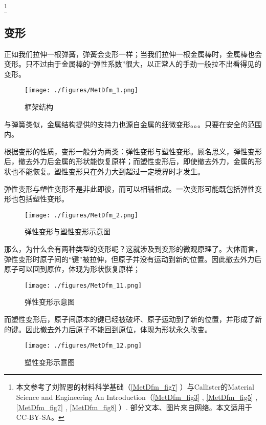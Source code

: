 
\footnote{本文参考了刘智恩的材料科学基础（\autoref{MetDfm_fig7} ）与Callister的Material Science and Engineering An Introduction（\autoref{MetDfm_fig3} , \autoref{MetDfm_fig5} , \autoref{MetDfm_fig7}  , \autoref{MetDfm_fig8} ）. 部分文本、图片来自网络。本文适用于CC-BY-SA。}

\subsection{变形}
正如我们拉伸一根弹簧，弹簧会变形一样；当我们拉伸一根金属棒时，金属棒也会变形。只不过由于金属棒的“弹性系数”很大，以正常人的手劲一般拉不出看得见的变形。

\begin{example}{}
\begin{figure}[ht]
\centering
\texttt{[image: ./figures/MetDfm\_1.png]}
\caption{框架结构} \label{MetDfm_fig1}
\end{figure}
与弹簧类似，金属结构提供的支持力也源自金属的细微变形。。。只要在安全的范围内。
\end{example}

根据变形的性质，变形一般分为两类：弹性变形与塑性变形。顾名思义，弹性变形后，撤去外力后金属的形状能恢复原样；而塑性变形后，即使撤去外力，金属的形状也不能恢复。塑性变形只在外力大到超过一定境界时才发生。

弹性变形与塑性变形不是非此即彼，而可以相辅相成。一次变形可能既包括弹性变形也包括塑性变形。

\begin{figure}[ht]
\centering
\texttt{[image: ./figures/MetDfm\_2.png]}
\caption{弹性变形与塑性变形示意图} \label{MetDfm_fig2}
\end{figure}

那么，为什么会有两种类型的变形呢？这就涉及到变形的微观原理了。大体而言，弹性变形时原子间的“键”被拉伸，但原子并没有运动到新的位置。因此撤去外力后原子可以回到原位，体现为形状恢复原样；
\begin{figure}[ht]
\centering
\texttt{[image: ./figures/MetDfm\_11.png]}
\caption{弹性变形示意图} \label{MetDfm_fig11}
\end{figure}
而塑性变形后，原子间原本的键已经被破坏、原子运动到了新的位置，并形成了新的键。因此撤去外力后原子不能回到原位，体现为形状永久改变。
\begin{figure}[ht]
\centering
\texttt{[image: ./figures/MetDfm\_12.png]}
\caption{塑性变形示意图} \label{MetDfm_fig12}
\end{figure}

